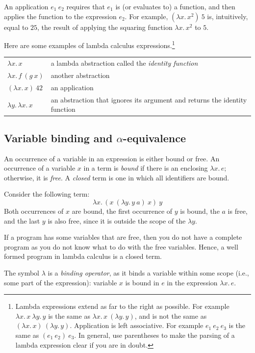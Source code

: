 An application $e_1\ e_2$ requires that $e_1$ is (or evaluates to) a function, and then applies the
function to the expression $e_2$. For example, $(\lambda x.\,x^2)\ 5$ is, intuitively, equal to
$25$, the result of applying the squaring function $\lambda x.\,x^2$ to $5$.

Here are some examples of lambda calculus expressions.\footnote{Lambda expressions extend as far to
the right as possible. For example $\lambda x.\,x\ \lambda y.\,y$ is the same as
$\lambda x.\,x\ (\lambda y.\,y)$, and is not the same as $(\lambda x.\,x)\ (\lambda y.\,y)$.
Application is left associative. For example $e_1\ e_2\ e_3$ is the same as $(e_1\ e_2)\ e_3$. In
general, use parentheses to make the parsing of a lambda expression clear if you are in doubt.}

\begin{center}
\begin{tabular}{ll}
  $\lambda x.\,x$ & a lambda abstraction called the \emph{identity function}\\
  $\lambda x.\,f\ (g\ x)$ & another abstraction\\
  $(\lambda x.\,x)\ 42$ & an application\\
  $\lambda y.\,\lambda x.\,x$ & an abstraction that ignores its argument and returns the identity function
\end{tabular}
\end{center}

\subsection{Variable binding and $\alpha$-equivalence}

An occurrence of a variable in an expression is either bound or free. An occurrence of a variable
$x$ in a term is \emph{bound} if there is an enclosing $\lambda x.\,e$; otherwise, it is
\emph{free}. A \emph{closed} term is one in which all identifiers are bound.

Consider the following term:
\[
  \lambda x.\,(x\ (\lambda y.\,y\ a)\ x)\ y
\]
Both occurrences of $x$ are bound, the first occurrence of $y$ is bound, the $a$ is free, and the
last $y$ is also free, since it is outside the scope of the $\lambda y$.

If a program has some variables that are free, then you do not have a complete program as you do not
know what to do with the free variables. Hence, a well formed program in lambda calculus is a
closed term.

The symbol $\lambda$ is a \emph{binding operator}, as it binds a variable within some scope (i.e.,
some part of the expression): variable $x$ is bound in $e$ in the expression $\lambda x.\,e$.

